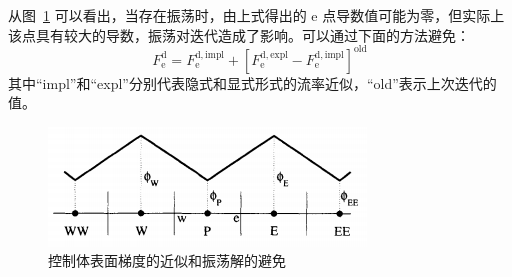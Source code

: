 从图~\ref{fig: approximation} 可以看出，当存在振荡时，由上式得出的 e 点导数值可能为零，但实际上该点具有较大的导数，振荡对迭代造成了影响。可以通过下面的方法避免：%
\begin{equation}
	F_{\mathrm{e}}^{\mathrm{d}} = F_{\mathrm{e}}^{\mathrm{d,impl}} +
	[F_{\mathrm{e}}^{\mathrm{d,expl}} - F_{\mathrm{e}}^{\mathrm{d,impl}}]^{\mathrm{old}}
\end{equation}
其中“impl”和“expl”分别代表隐式和显式形式的流率近似，“old”表示上次迭代的值。

\begin{figure}
	\centering
	\includegraphics[scale=.8]{figs/approximation}
	\caption{控制体表面梯度的近似和振荡解的避免 \cite[235]{Ferziger2002}}
	\label{fig: approximation}
\end{figure}

